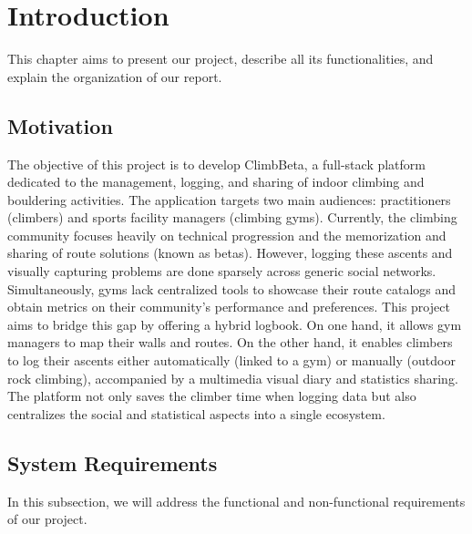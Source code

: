 %
%
\chapter{Introduction} \label{cap:introduction}

This chapter aims to present our project, describe all its functionalities, and explain the organization of our report.


%
%
\section{Motivation} \label{sec11}

The objective of this project is to develop ClimbBeta, a full-stack platform dedicated to the management, logging, and sharing of indoor climbing and bouldering activities. The application targets two main audiences: practitioners (climbers) and sports facility managers (climbing gyms). Currently, the climbing community focuses heavily on technical progression and the memorization and sharing of route solutions (known as betas). However, logging these ascents and visually capturing problems are done sparsely across generic social networks. Simultaneously, gyms lack centralized tools to showcase their route catalogs and obtain metrics on their community's performance and preferences. This project aims to bridge this gap by offering a hybrid logbook. On one hand, it allows gym managers to map their walls and routes. On the other hand, it enables climbers to log their ascents either automatically (linked to a gym) or manually (outdoor rock climbing), accompanied by a multimedia visual diary and statistics sharing. The platform not only saves the climber time when logging data but also centralizes the social and statistical aspects into a single ecosystem.


%
%
\section{System Requirements} \label{sec12}

In this subsection, we will address the functional and non-functional requirements of our
project.

%
%
